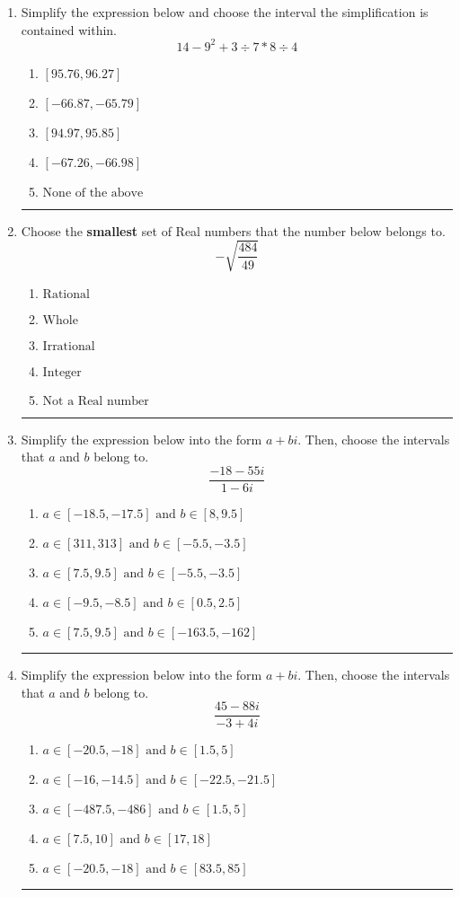 \documentclass[14pt]{extbook}
\newcommand{\litem}[1]{\item#1\hspace*{-1cm}\rule{\textwidth}{0.4pt}}
\begin{document}
\begin{enumerate}
{\begin{enumerate}[label=\Alph*.]
\end{enumerate} }
\litem{
Simplify the expression below and choose the interval the simplification is contained within.\[ 14 - 9^2 + 3 \div 7 * 8 \div 4 \]\begin{enumerate}[label=\Alph*.]
\item \( [95.76, 96.27] \)
\item \( [-66.87, -65.79] \)
\item \( [94.97, 95.85] \)
\item \( [-67.26, -66.98] \)
\item \( \text{None of the above} \)

\end{enumerate} }
\litem{
Choose the \textbf{smallest} set of Real numbers that the number below belongs to.\[ -\sqrt{\frac{484}{49}} \]\begin{enumerate}[label=\Alph*.]
\item \( \text{Rational} \)
\item \( \text{Whole} \)
\item \( \text{Irrational} \)
\item \( \text{Integer} \)
\item \( \text{Not a Real number} \)

\end{enumerate} }
\litem{
Simplify the expression below into the form $a+bi$. Then, choose the intervals that $a$ and $b$ belong to.\[ \frac{-18 - 55 i}{1 - 6 i} \]\begin{enumerate}[label=\Alph*.]
\item \( a \in [-18.5, -17.5] \text{ and } b \in [8, 9.5] \)
\item \( a \in [311, 313] \text{ and } b \in [-5.5, -3.5] \)
\item \( a \in [7.5, 9.5] \text{ and } b \in [-5.5, -3.5] \)
\item \( a \in [-9.5, -8.5] \text{ and } b \in [0.5, 2.5] \)
\item \( a \in [7.5, 9.5] \text{ and } b \in [-163.5, -162] \)

\end{enumerate} }
\litem{
Simplify the expression below into the form $a+bi$. Then, choose the intervals that $a$ and $b$ belong to.\[ \frac{45 - 88 i}{-3 + 4 i} \]\begin{enumerate}[label=\Alph*.]
\item \( a \in [-20.5, -18] \text{ and } b \in [1.5, 5] \)
\item \( a \in [-16, -14.5] \text{ and } b \in [-22.5, -21.5] \)
\item \( a \in [-487.5, -486] \text{ and } b \in [1.5, 5] \)
\item \( a \in [7.5, 10] \text{ and } b \in [17, 18] \)
\item \( a \in [-20.5, -18] \text{ and } b \in [83.5, 85] \)


\end{enumerate}}
\end{enumerate}
\end{document}
